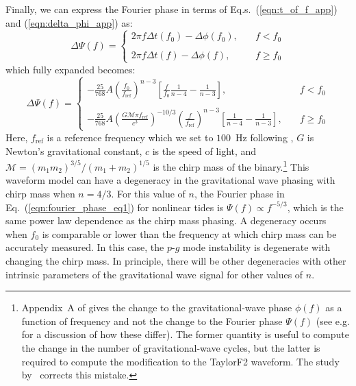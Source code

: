 Finally, we can express the Fourier phase in terms of Eq.s.~(\ref{eqn:t_of_f_app}) and (\ref{eqn:delta_phi_app}) as:
\begin{equation}\label{eqn:fourier_phase_app}
\Delta \Psi(f) = \left \{
                     \begin{array}{ll}
                      2 \pi f \Delta t(f_0) - \Delta \phi(f_0), &\quad  f < f_0 \\ \\
                      2 \pi f \Delta t(f) - \Delta \phi(f), &\quad f \ge f_0
                     \end{array}
                     \right.
\end{equation}
which fully expanded becomes:
\begin{equation}\label{eqn:fourier_phase_final_app}
\Delta \Psi(f) = \left \{
                     \begin{array}{ll}
                      - \frac{25}{768} A \left ( \frac{f_0}{f_{\mathrm{ref}}} \right)^{n-3} \left [ \frac{f}{f_0}\frac{1}{n-4} - \frac{1}{n-3} \right], &\quad  f < f_0 \\ \\
                      - \frac{25}{768} A \left (\frac{G \mathcal{M} \pi f_{\mathrm{ref}}}{c^3} \right )^{-10/3} \left ( \frac{f}{f_{\mathrm{ref}}} \right )^{n-3} \left [\frac{1}{n-4} - \frac{1}{n-3} \right ],  &\quad  f \ge f_0
                      \end{array}
                 \right.
\end{equation}
Here, $f_\mathrm{ref}$ is a reference frequency which we set to $100$~Hz following \cite{Essick:2016tkn}, $G$ is Newton's gravitational constant, $c$ is the speed of light, and $\mathcal{M} = (m_1 m_2)^{3/5}/(m_1+m_2)^{1/5}$ is the chirp mass of the binary.\footnote{Appendix~A of \cite{Essick:2016tkn} gives the change to the gravitational-wave phase $\phi(f)$ as a function of frequency and not the change to the Fourier phase $\Psi(f)$ (see e.g. \cite{Lindblom:2008cm} for a discussion of how these differ). The former quantity is useful to compute the change in the number of gravitational-wave cycles, but the latter is required to compute the modification to the TaylorF2 waveform. The study by~\cite{abbott2019constraining} corrects this mistake.} This waveform model can have a degeneracy in the gravitational wave phasing with chirp mass when $n = 4/3$. For this value of $n$, the Fourier phase in Eq.~(\ref{eqn:fourier_phase_eq1}) for nonlinear tides is $\Psi(f) \propto f^{-5/3}$, which is the same power law dependence as the chirp mass phasing. A degeneracy occurs when $f_0$ is comparable or lower than the frequency at which chirp mass can be accurately measured. In this case, the $p$-$g$ mode instability is degenerate with changing the chirp mass. In principle, there will be other degeneracies with other intrinsic parameters of the gravitational wave signal for other values of $n$.

